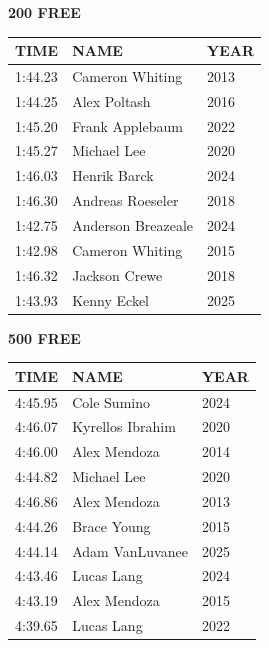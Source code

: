 \begin{table}[H]
\centering
\begin{minipage}[t]{0.48\textwidth}
\centering
\textbf{200 FREE}\\[0.1cm]
\begin{tabular}{@{}p{1.8cm}p{2.8cm}p{1.2cm}@{}}
\hline
    \textbf{TIME} & \textbf{NAME} & \textbf{YEAR} \\
\hline
    1:44.23 & Cameron Whiting & 2013 \\
    1:44.25 & Alex Poltash & 2016 \\
    1:45.20 & Frank Applebaum & 2022 \\
    1:45.27 & Michael Lee & 2020 \\
    1:46.03 & Henrik Barck & 2024 \\
    1:46.30 & Andreas Roeseler & 2018 \\
    1:42.75 & Anderson Breazeale & 2024 \\
    1:42.98 & Cameron Whiting & 2015 \\
    1:46.32 & Jackson Crewe & 2018 \\
    1:43.93 & Kenny Eckel & 2025 \\
\hline
\end{tabular}
\end{minipage}\hfill
\begin{minipage}[t]{0.48\textwidth}
\centering
\textbf{500 FREE}\\[0.1cm]
\begin{tabular}{@{}p{1.8cm}p{2.8cm}p{1.2cm}@{}}
\hline
    \textbf{TIME} & \textbf{NAME} & \textbf{YEAR} \\
\hline
    4:45.95 & Cole Sumino & 2024 \\
    4:46.07 & Kyrellos Ibrahim & 2020 \\
    4:46.00 & Alex Mendoza & 2014 \\
    4:44.82 & Michael Lee & 2020 \\
    4:46.86 & Alex Mendoza & 2013 \\
    4:44.26 & Brace Young & 2015 \\
    4:44.14 & Adam VanLuvanee & 2025 \\
    4:43.46 & Lucas Lang & 2024 \\
    4:43.19 & Alex Mendoza & 2015 \\
    4:39.65 & Lucas Lang & 2022 \\
\hline
\end{tabular}
\end{minipage}
\end{table}

